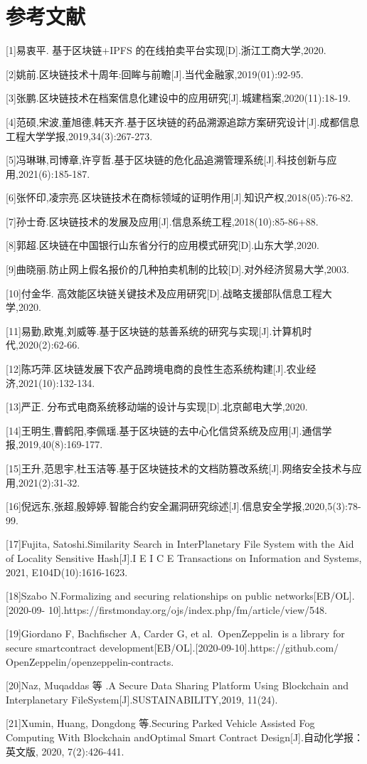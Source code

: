 \documentclass[
  10
]{article}
\begin{document}
\section{参考文献}\label{ux53c2ux8003ux6587ux732e}

{[}1{]}易衷平. 基于区块链+IPFS
的在线拍卖平台实现{[}D{]}.浙江工商大学,2020.

{[}2{]}姚前.区块链技术十周年:回眸与前瞻{[}J{]}.当代金融家,2019(01):92-95.

{[}3{]}张鹏.区块链技术在档案信息化建设中的应用研究{[}J{]}.城建档案,2020(11):18-19.

{[}4{]}范硕,宋波,董旭德,韩天齐.基于区块链的药品溯源追踪方案研究设计{[}J{]}.成都信息工程大学学报,2019,34(3):267-273.

{[}5{]}冯琳琳,司博章,许亨哲.基于区块链的危化品追溯管理系统{[}J{]}.科技创新与应用,2021(6):185-187.

{[}6{]}张怀印,凌宗亮.区块链技术在商标领域的证明作用{[}J{]}.知识产权,2018(05):76-82.

{[}7{]}孙士奇.区块链技术的发展及应用{[}J{]}.信息系统工程,2018(10):85-86+88.

{[}8{]}郭超.区块链在中国银行山东省分行的应用模式研究{[}D{]}.山东大学,2020.

{[}9{]}曲晓丽.防止网上假名报价的几种拍卖机制的比较{[}D{]}.对外经济贸易大学,2003.

{[}10{]}付金华.
高效能区块链关键技术及应用研究{[}D{]}.战略支援部队信息工程大学,2020.

{[}11{]}易勤,欧嵬,刘威等.基于区块链的慈善系统的研究与实现{[}J{]}.计算机时代,2020(2):62-66.

{[}12{]}陈巧萍.区块链发展下农产品跨境电商的良性生态系统构建{[}J{]}.农业经济,2021(10):132-134.

{[}13{]}严正. 分布式电商系统移动端的设计与实现{[}D{]}.北京邮电大学,2020.

{[}14{]}王明生,曹鹤阳,李佩瑶.基于区块链的去中心化信贷系统及应用{[}J{]}.通信学报,2019,40(8):169-177.

{[}15{]}王升,范思宇,杜玉洁等.基于区块链技术的文档防篡改系统{[}J{]}.网络安全技术与应用,2021(2):31-32.

{[}16{]}倪远东,张超,殷婷婷.智能合约安全漏洞研究综述{[}J{]}.信息安全学报,2020,5(3):78-99.

{[}17{]}Fujita, Satoshi.Similarity Search in InterPlanetary File System
with the Aid of Locality Sensitive Hash{[}J{]}.I E I C E Transactions on
Information and Systems, 2021, E104D(10):1616-1623.

{[}18{]}Szabo N.Formalizing and securing relationships on public
networks{[}EB/OL{]}.{[}2020-09-
10{]}.https://firstmonday.org/ojs/index.php/fm/article/view/548.

{[}19{]}Giordano F, Bachfischer A, Carder G, et al.~OpenZeppelin is a
library for secure smartcontract
development{[}EB/OL{]}.{[}2020-09-10{]}.https://github.com/
OpenZeppelin/openzeppelin-contracts.

{[}20{]}Naz, Muqaddas 等 .A Secure Data Sharing Platform Using
Blockchain and Interplanetary FileSystem{[}J{]}.SUSTAINABILITY,2019,
11(24).

{[}21{]}Xumin, Huang, Dongdong 等.Securing Parked Vehicle Assisted Fog
Computing With Blockchain andOptimal Smart Contract
Design{[}J{]}.自动化学报：英文版, 2020, 7(2):426-441.
\end{document}
